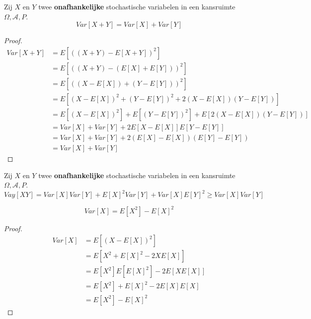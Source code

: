 \documentclass[main.tex]{subfiles}
\begin{document}
\begin{ei}
  Zij $X$ en $Y$ twee \textbf{onafhankelijke} stochastische variabelen in een kansruimte $\Omega,\mathcal{A},P$.
  \[ Var[X+Y] = Var[X] + Var[Y] \]

  \begin{proof}
    \begin{align*}
      Var[X+Y]
      &= E\left[\left((X + Y) - E[X+Y]\right)^{2}\right]\\
      &= E\left[\left((X + Y) - (E[X] + E[Y])\right)^{2}\right]\\
      &= E\left[\left((X - E[X]) + (Y - E[Y])\right)^{2}\right]\\
      &= E\left[(X - E[X])^{2} + (Y - E[Y])^{2} + 2(X - E[X])(Y - E[Y])\right]\\
      &= E\left[(X - E[X])^{2}\right] + E\left[(Y - E[Y])^{2}\right] + E\left[2(X - E[X])(Y - E[Y])\right]\\
      &= Var[X] + Var[Y] + 2E\left[X-E[X]\right]E\left[Y-E[Y]\right]\\
      &= Var[X] + Var[Y] + 2(E[X] - E[X])(E[Y]-E[Y])\\
      &= Var[X] + Var[Y]
    \end{align*}
  \end{proof}
\end{ei}

\begin{ei}
  Zij $X$ en $Y$ twee \textbf{onafhankelijke} stochastische variabelen in een kansruimte $\Omega,\mathcal{A},P$.
  \[ Vay[XY] = Var[X]Var[Y] + E[X]^{2}Var[Y] + Var[X]E[Y]^{2} \ge Var[X]Var[Y] \]

\end{ei}

\begin{st}
  \[ Var[X] = E[X^{2}] - E[X]^{2} \]

  \begin{proof}
    \begin{align*}
      Var[X]
      &= E\left[(X-E[X])^{2}\right]\\
      &= E\left[X^{2}+E[X]^{2} - 2XE[X]\right]\\
      &= E\left[X^{2}\right] E\left[E[X]^{2}\right] -2E\left[X E[X]\right]\\
      &= E\left[X^{2}\right] + E[X]^{2} - 2E[X]E[X]\\
      &= E\left[X^{2}\right] - E[X]^{2}
    \end{align*}
  \end{proof}
\end{st}
\end{document}
